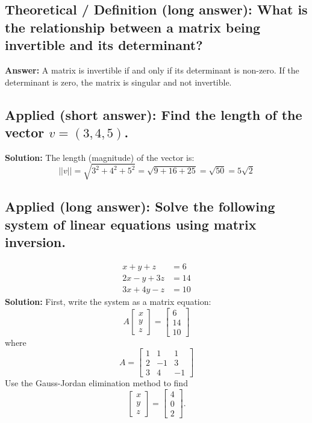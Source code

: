 \documentclass[12pt]{article}
\begin{document}
\subsection{Theoretical / Definition (long answer): What is the relationship between a matrix being invertible and its determinant?}
\textbf{Answer:} A matrix is invertible if and only if its determinant is non-zero. If the determinant is zero, the matrix is singular and not invertible.

\subsection{Applied (short answer): Find the length of the vector \( v = (3, 4, 5) \).}
\textbf{Solution:}
The length (magnitude) of the vector is:
\[
||v|| = \sqrt{3^2 + 4^2 + 5^2} = \sqrt{9 + 16 + 25} = \sqrt{50} = 5\sqrt{2}
\]

\subsection{Applied (long answer): Solve the following system of linear equations using matrix inversion.}
\[
\begin{aligned}
x + y + z &= 6 \\
2x - y + 3z &= 14 \\
3x + 4y - z &= 10
\end{aligned}
\]
\textbf{Solution:}
First, write the system as a matrix equation:
\[
A \begin{bmatrix} x \\ y \\ z \end{bmatrix} = \begin{bmatrix} 6 \\ 14 \\ 10 \end{bmatrix}
\]
where
\[
A = \begin{bmatrix} 1 & 1 & 1 \\ 2 & -1 & 3 \\ 3 & 4 & -1 \end{bmatrix}
\]
Use the Gauss-Jordan elimination method to find
\[\begin{bmatrix} x \\ y \\ z \end{bmatrix} = \begin{bmatrix} 4 \\ 0 \\ 2 \end{bmatrix}.\]
\end{document}
